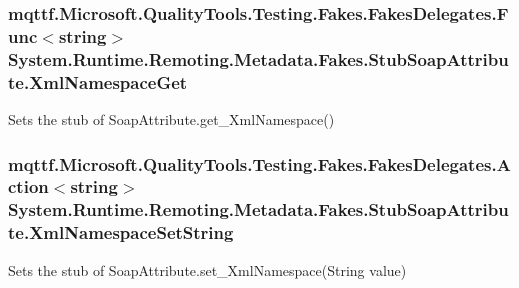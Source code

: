 \hypertarget{class_system_1_1_runtime_1_1_remoting_1_1_metadata_1_1_fakes_1_1_stub_soap_attribute_a58e543455b94ab15aef3b5501abb5d0c}{
\subsubsection[{Xml\-Namespace\-Get}]{\setlength{\rightskip}{0pt plus 5cm}mqttf.\-Microsoft.\-Quality\-Tools.\-Testing.\-Fakes.\-Fakes\-Delegates.\-Func$<$string$>$ System.\-Runtime.\-Remoting.\-Metadata.\-Fakes.\-Stub\-Soap\-Attribute.\-Xml\-Namespace\-Get}}\label{class_system_1_1_runtime_1_1_remoting_1_1_metadata_1_1_fakes_1_1_stub_soap_attribute_a58e543455b94ab15aef3b5501abb5d0c}


Sets the stub of Soap\-Attribute.\-get\-\_\-\-Xml\-Namespace()

\hypertarget{class_system_1_1_runtime_1_1_remoting_1_1_metadata_1_1_fakes_1_1_stub_soap_attribute_adfa5bf590324df49808a67b998e1066e}{
\subsubsection[{Xml\-Namespace\-Set\-String}]{\setlength{\rightskip}{0pt plus 5cm}mqttf.\-Microsoft.\-Quality\-Tools.\-Testing.\-Fakes.\-Fakes\-Delegates.\-Action$<$string$>$ System.\-Runtime.\-Remoting.\-Metadata.\-Fakes.\-Stub\-Soap\-Attribute.\-Xml\-Namespace\-Set\-String}}\label{class_system_1_1_runtime_1_1_remoting_1_1_metadata_1_1_fakes_1_1_stub_soap_attribute_adfa5bf590324df49808a67b998e1066e}


Sets the stub of Soap\-Attribute.\-set\-\_\-\-Xml\-Namespace(\-String value)



